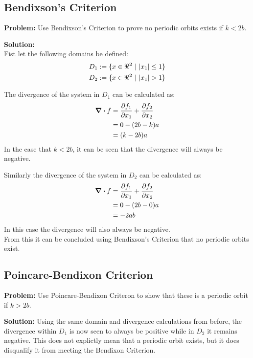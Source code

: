 \documentclass[letter]{article}
\begin{document}
\subsection{Bendixson's Criterion}
\textbf{Problem:}
Use Bendixson's Criterion to prove no periodic orbits exists if $k < 2b$.

\noindent
\textbf{Solution:}\\
Fist let the following domains be defined:
\begin{equation}
	\begin{aligned}
		D_1 := \{x \in \real^2 \ | \ \abs{x_1} \leq 1\}\\
		D_2 := \{x \in \real^2 \ | \ \abs{x_1} > 1\}
	\end{aligned}
\end{equation}

The divergence of the system in $D_1$ can be calculated as:
\begin{align}
	\div f  &= \pdv{f_1}{x_1} + \pdv{f_2}{x_2} \nonumber\\
	&= 0 - (2b - k)a\\
	&= (k - 2b)a
\end{align}
In the case that $k < 2b$, it can be seen that the divergence will always be negative.

Similarly the divergence of the system in $D_2$ can be calculated as:
\begin{align}
	\div f  &= \pdv{f_1}{x_1} + \pdv{f_2}{x_2} \nonumber\\
	&= 0 - (2b - 0)a\\
	&= - 2ab
\end{align}
In this case the divergence will also always be negative.\\

From this it can be concluded using Bendixson's Criterion that no periodic orbits exist.

\newpage
\subsection{Poincare-Bendixon Criterion}
\textbf{Problem:}
Use Poincare-Bendixon Criteron to show that these is a periodic orbit if $k > 2b$.

\noindent
\textbf{Solution:}
Using the same domain and divergence calculations from before, the divergence within $D_1$ is now seen to always be positive while in $D_2$ it remains negative. This does not explictly mean that a periodic orbit exists, but it does disqualify it from meeting the Bendixon Criterion.\\
\end{document}
